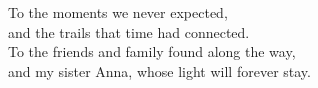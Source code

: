 \begin{titlepage}
\thispagestyle{empty}
\topmargin=6.5cm
\raggedleft
\large
\em

To the moments we never expected,\\
\vspace{1.4mm}
and the trails that time had connected.\\   %
\vspace{1.4mm}
To the friends and family found along the way,\\
\vspace{1.4mm}
and my sister Anna, whose light will forever stay.
\newpage



\clearpage{\pagestyle{empty}\cleardoublepage}
\end{titlepage}